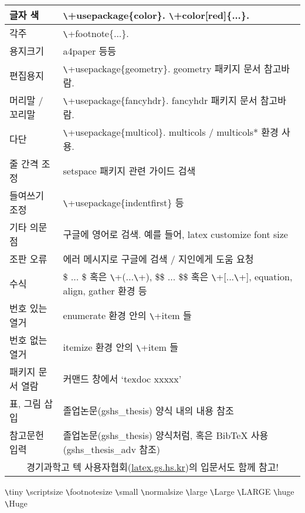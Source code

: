\documentclass[11pt]{article}
\begin{document}
\begin{table}[h]
\begin{tabular}{|p{}|p{}|}
		\hline
		글자 색 & \verb+\+usepackage\{color\}. \verb+\+color[red]\{...\}. \\
		\hline
		각주 & \verb+\+footnote\{...\}. \\
		\hline
		용지크기 & a4paper 등등 \\
		\hline
		편집용지 & \verb+\+usepackage\{geometry\}. geometry 패키지 문서 참고바람. \\
		\hline
		머리말 / 꼬리말 & \verb+\+usepackage\{fancyhdr\}. fancyhdr 패키지 문서 참고바람. \\
		\hline
		다단 & \verb+\+usepackage\{multicol\}. multicols / multicols* 환경 사용. \\
		\hline
		줄 간격 조정 & setspace 패키지 관련 가이드 검색 \\
		\hline
		들여쓰기 조정 & \verb+\+usepackage\{indentfirst\} 등 \\
		\hline
		기타 의문점 & 구글에 영어로 검색. 예를 들어, latex customize font size \\
		\hline
		조판 오류 & 에러 메시지로 구글에 검색 / 지인에게 도움 요청 \\
		\hline
		수식 & \$ ... \$ 혹은 \verb+\+(...\verb+\+), \$\$ ... \$\$ 혹은 \verb+\+[...\verb+\+], equation, align, gather 환경 등 \\
		\hline
		번호 있는 열거 & enumerate 환경 안의 \verb+\+item 들\\
		\hline
		번호 없는 열거 & itemize 환경 안의 \verb+\+item 들 \\
		\hline
		패키지 문서 열람 & 커맨드 창에서 `texdoc xxxxx' \\
		\hline
		표, 그림 삽입 & 졸업논문(gshs\_thesis) 양식 내의 내용 참조 \\
		\hline
		참고문헌 입력 & 졸업논문(gshs\_thesis) 양식처럼, 혹은 BibTeX 사용(gshs\_thesis\_adv 참조) \\
		\hline
		\multicolumn{2}{|c|}{경기과학고 텍 사용자협회(\url{latex.gs.hs.kr})의 입문서도 함께 참고!} \\
		\hline
	\end{tabular}
\end{table}
{\tiny \verb+\+tiny} {\scriptsize \verb+\+scriptsize} {\footnotesize \verb+\+footnotesize} {\small \verb+\+small} {\normalsize \verb+\+normalsize} {\large \verb+\+large} {\Large \verb+\+Large} {\LARGE \verb+\+LARGE} {\huge \verb+\+huge} {\Huge \verb+\+Huge}
\end{document}
